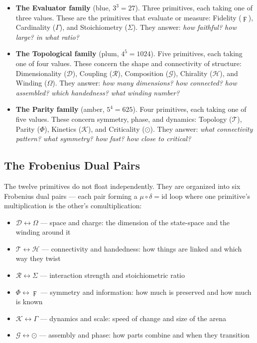 \documentclass[11pt,a4paper,twocolumn]{article}
\begin{document}
\begin{itemize}
\item \textbf{The Evaluator family} (blue, $3^3 = 27$). Three primitives, each taking one of three values. These are the primitives that evaluate or measure: Fidelity ($\digamma$), Cardinality ($\Gamma$), and Stoichiometry ($\Sigma$). They answer: \emph{how faithful? how large? in what ratio?}

\item \textbf{The Topological family} (plum, $4^5 = 1024$). Five primitives, each taking one of four values. These concern the shape and connectivity of structure: Dimensionality ($\mathcal{D}$), Coupling ($\mathcal{R}$), Composition ($\mathcal{G}$), Chirality ($\mathcal{H}$), and Winding ($\Omega$). They answer: \emph{how many dimensions? how connected? how assembled? which handedness? what winding number?}

\item \textbf{The Parity family} (amber, $5^4 = 625$). Four primitives, each taking one of five values. These concern symmetry, phase, and dynamics: Topology ($\mathcal{T}$), Parity ($\Phi$), Kinetics ($\mathcal{K}$), and Criticality ($\odot$). They answer: \emph{what connectivity pattern? what symmetry? how fast? how close to critical?}
\end{itemize}

\subsection{The Frobenius Dual Pairs}

The twelve primitives do not float independently. They are organized into six Frobenius dual pairs — each pair forming a $\mu \circ \delta = \text{id}$ loop where one primitive's multiplication is the other's comultiplication:
\begin{itemize}
\item $\mathcal{D} \leftrightarrow \Omega$ — space and charge: the dimension of the state-space and the winding around it
\item $\mathcal{T} \leftrightarrow \mathcal{H}$ — connectivity and handedness: how things are linked and which way they twist
\item $\mathcal{R} \leftrightarrow \Sigma$ — interaction strength and stoichiometric ratio
\item $\Phi \leftrightarrow \digamma$ — symmetry and information: how much is preserved and how much is known
\item $\mathcal{K} \leftrightarrow \Gamma$ — dynamics and scale: speed of change and size of the arena
\item $\mathcal{G} \leftrightarrow \odot$ — assembly and phase: how parts combine and when they transition
\end{itemize}
\end{document}
